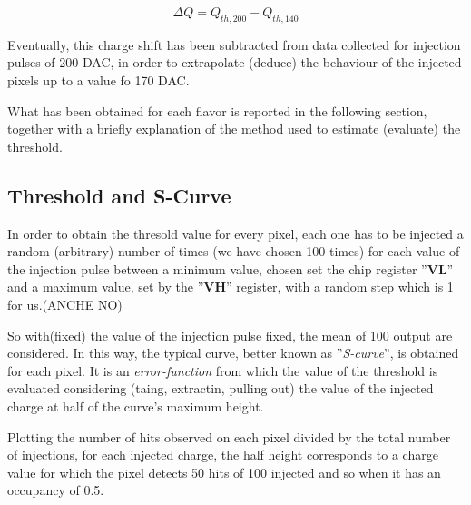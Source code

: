 \begin{equation}
\Delta Q = Q_{th,200} - Q_{th,140}
\end{equation}

Eventually, this charge shift has been subtracted from data collected for injection pulses of 200 DAC, in order to extrapolate (deduce) the behaviour of the injected pixels up to a value fo 170 DAC.

What has been obtained for each flavor is reported in the following section, together with a briefly explanation of the method used to estimate (evaluate) the threshold.


\subsection{Threshold and S-Curve}

In order to obtain the thresold value for every pixel, each one has to be injected a random (arbitrary) number of times (we have chosen 100 times) for each value of the injection pulse between a minimum value, chosen set the chip register ''\textbf{VL}'' and a maximum value, set by the ''\textbf{VH}'' register, with a random step which is 1 for us.(ANCHE NO)

So with(fixed) the value of the injection pulse fixed, the mean of 100 output are considered. In this way, the typical curve, better known as ''\textit{S-curve}'', is obtained for each pixel. It is an \textit{error-function} from which the value of the threshold is evaluated considering (taing, extractin, pulling out) the value of the injected charge at half of the curve's maximum height.

Plotting the number of hits observed on each pixel divided by the total number of injections, for each injected charge, the half height corresponds to a charge value for which the pixel detects 50 hits of 100 injected and so when it has an occupancy of 0.5.



\begin{comment}
\begin{figure}
\centering
\texttt{[image: ]}
\caption{An example of the S-Curve and the evluation of the threshold.}
\label{ex_scurve}
\end{figure}
\end{comment}

